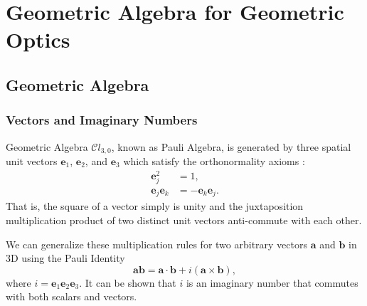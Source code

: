 \documentclass[a4paper,twocolumn,superscriptaddress]{revtex4-1}
\begin{document}
\section{Geometric Algebra for Geometric Optics} \label{sec:geometricalgebra}

\subsection{Geometric Algebra}

\subsubsection{Vectors and Imaginary Numbers}

Geometric Algebra $\mathcal{C}l_{3,0}$, known as Pauli Algebra,\cite{baylis1} is generated by three spatial unit vectors $\mathbf e_1$, $\mathbf e_2$, and $\mathbf e_3$ which satisfy the orthonormality axioms
\cite{thethreeladies}:
\begin{subequations} 
  \label{eq:garules}
  \begin{align} 
    \label{eq:unitsquare} 
    \mathbf e_j^2 &= 1, 
\\
    \label{eq:flip} 
    \mathbf e_j \mathbf e_k &= -\mathbf e_k \mathbf e_j .
  \end{align}
\end{subequations}
That is, the square of a vector simply is unity and the juxtaposition multiplication product of two distinct unit vectors anti-commute with each other.

We can generalize these multiplication rules for two arbitrary vectors $\mathbf a$ and $\mathbf b$ in 3D using the Pauli Identity\cite{baylis1,lounesto}
\begin{equation}
  \label{eq:pauliidentity}
  \mathbf{a}\mathbf{b} = 
  \mathbf{a} \cdot \mathbf{b} + i(\mathbf{a} \times \mathbf{b}) ,
\end{equation}
where $  i = \mathbf e_1 \mathbf e_2 \mathbf e_3 $.
It can be shown that $i$ is an imaginary number that commutes with both scalars and vectors.
\end{document}
